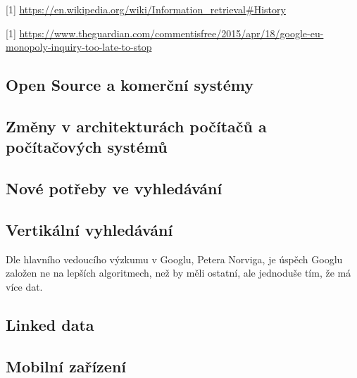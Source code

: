 \documentclass[12pt]{article}
\begin{document}

[1] \url{https://en.wikipedia.org/wiki/Information_retrieval#History}


[1] \url{https://www.theguardian.com/commentisfree/2015/apr/18/google-eu-monopoly-inquiry-too-late-to-stop}

\subsection{Open Source a komerční systémy}

\subsection{Změny v architekturách počítačů a počítačových systémů}


\subsection{Nové potřeby ve vyhledávání}
\subsection{Vertikální vyhledávání}
Dle hlavního vedoucího výzkumu v Googlu, Petera Norviga, je úspěch Googlu
založen ne na lepších algoritmech, než by měli ostatní, ale jednoduše tím, že
má více dat.
\subsection{Linked data}
\subsection{Mobilní zařízení}
\end{document}
